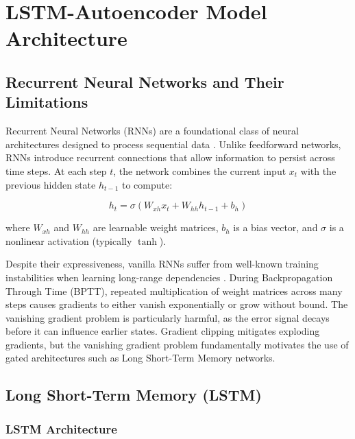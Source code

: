 \chapter{LSTM-Autoencoder Model Architecture}
\label{ch:model_architecture}

\section{Recurrent Neural Networks and Their Limitations}
\label{sec:rnn}

Recurrent Neural Networks (RNNs) are a foundational class of neural architectures
designed to process sequential data \cite{rumelhart1986learning, goodfellow2016deep}.
Unlike feedforward networks, RNNs introduce recurrent connections that allow
information to persist across time steps. At each step $t$, the network combines the
current input $x_t$ with the previous hidden state $h_{t-1}$ to compute:

\begin{equation}
    h_t = \sigma(W_{xh} x_t + W_{hh} h_{t-1} + b_h)
    \label{eq:rnn_hidden}
\end{equation}

\noindent where $W_{xh}$ and $W_{hh}$ are learnable weight matrices, $b_h$ is a bias
vector, and $\sigma$ is a nonlinear activation (typically $\tanh$).

Despite their expressiveness, vanilla RNNs suffer from well-known training instabilities
when learning long-range dependencies \cite{bengio1994learning, pascanu2013difficulty}.
During Backpropagation Through Time (BPTT), repeated multiplication of weight matrices
across many steps causes gradients to either vanish exponentially or grow without bound.
The vanishing gradient problem is particularly harmful, as the error signal decays
before it can influence earlier states. Gradient clipping \cite{pascanu2013difficulty}
mitigates exploding gradients, but the vanishing gradient problem fundamentally
motivates the use of gated architectures such as Long Short-Term Memory networks.

\section{Long Short-Term Memory (LSTM)}
\label{sec:lstm}

\subsection{LSTM Architecture}
\label{subsec:lstm_architecture}


